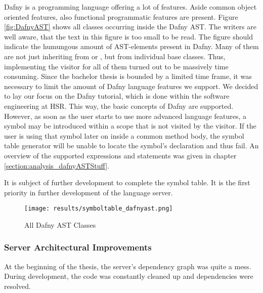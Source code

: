 Dafny is a programming language offering a lot of features.
Aside common object oriented features, also functional programmatic features are present.
Figure \ref{fig:DafnyAST} shows all classes occurring inside the Dafny AST.
The writers are well aware, that the text in this figure is too small to be read.
The figure should indicate the humungous amount of AST-elements present in Dafny.
Many of them are not just inheriting from  or , but from individual base classes.
Thus, implementing the visitor for all of them turned out to be massively time consuming.
Since the bachelor thesis is bounded by a limited time frame, it was necessary to limit the amount of Dafny language features we support.
We decided to lay our focus on the Dafny tutorial, which is done within the software engineering at HSR.
This way, the basic concepts of Dafny are supported.
However, as soon as the user starts to use more advanced language features, a symbol may be introduced within a scope that is not visited by the visitor.
If the user is using that symbol later on inside a common method body, the symbol table generator will be unable to locate the symbol's declaration and thus fail.
An overview of the supported expressions and statements was given in chapter \ref{section:analysis_dafnyASTStuff}.\\


It is subject of further development to complete the symbol table.
It is the first priority in further development of the language server.
\begin{figure}[h]
    \centering
    \texttt{[image: results/symboltable\_dafnyast.png]}
    \caption{All Dafny AST Classes}
    \label{fig:dafnyASTOverview}
\end{figure}

\subsubsection{Server Architectural Improvements}
At the beginning of the thesis, the server's dependency graph was quite a mess.
During development, the code was constantly cleaned up and dependencies were resolved.

